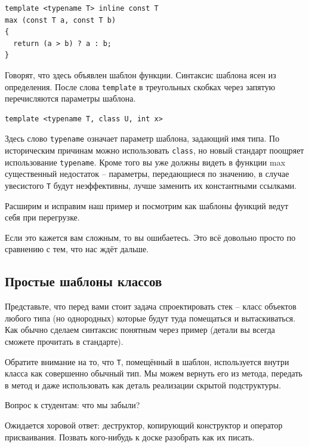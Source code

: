 \documentclass[a4paper,12pt,oneside]{article}
\begin{document}
\begin{lstlisting}
template <typename T> inline const T 
max (const T a, const T b)
{
  return (a > b) ? a : b;
} 
\end{lstlisting}

Говорят, что здесь объявлен шаблон функции. Синтаксис шаблона ясен из определения. После слова \lstinline!template! в треугольных скобках через запятую перечисляются параметры шаблона.

\begin{lstlisting}
template <typename T, class U, int x>
\end{lstlisting}

Здесь слово \lstinline!typename! означает параметр шаблона, задающий имя типа. По историческим причинам можно использовать \lstinline!class!, но новый стандарт поощряет использование \lstinline!typename!. Кроме того вы уже должны видеть в функции max существенный недостаток – параметры, передающиеся по значению, в случае увесистого \lstinline!T! будут неэффективны, лучше заменить их константными ссылками.

Расширим и исправим наш пример и посмотрим как шаблоны функций ведут себя при перегрузке.



Если это кажется вам сложным, то вы ошибаетесь. Это всё довольно просто по сравнению с тем, что нас ждёт дальше.

\subsection{Простые шаблоны классов}

Представьте, что перед вами стоит задача спроектировать стек – класс объектов любого типа (но однородных) которые будут туда помещаться и вытаскиваться. Как обычно сделаем синтаксис понятным через пример (детали вы всегда сможете прочитать в стандарте).



Обратите внимание на то, что \lstinline!T!, помещённый в шаблон, используется внутри класса как совершенно обычный тип. Мы можем вернуть его из метода, передать в метод и даже использовать как деталь реализации скрытой подструктуры.



Вопрос к студентам: что мы забыли?

Ожидается хоровой ответ: деструктор, копирующий конструктор и оператор присваивания. Позвать кого-нибудь к доске разобрать как их писать.
\end{document}
